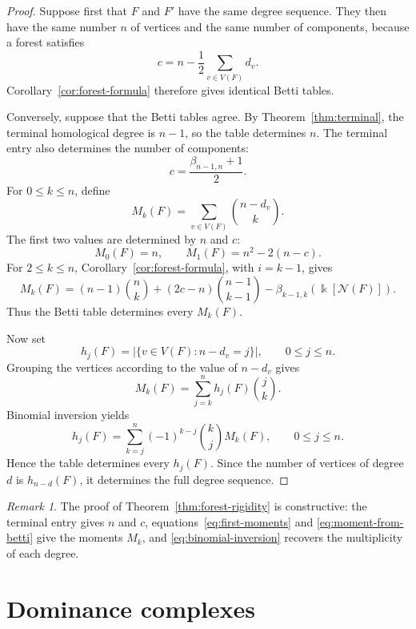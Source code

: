 \documentclass[11pt]{amsart}
\theoremstyle{definition}
\theoremstyle{remark}
\newtheorem{remark}[theorem]{Remark}
\numberwithin{equation}{section}
\newcommand{\NN}{\mathcal N}
\begin{document}
	\begin{proof}
		Suppose first that \(F\) and \(F'\) have the same degree sequence. They then
		have the same number \(n\) of vertices and the same number of components,
		because a forest satisfies
		\[
		c=n-\frac12\sum_{v\in V(F)}d_v.
		\]
		Corollary~\ref{cor:forest-formula} therefore gives identical Betti tables.

		Conversely, suppose that the Betti tables agree. By
		Theorem~\ref{thm:terminal}, the terminal homological degree is \(n-1\), so the
		table determines \(n\). The terminal entry also determines the number of
		components:
		\[
		c=\frac{\beta_{n-1,n}+1}{2}.
		\]
		For \(0\le k\le n\), define
		\[
		M_k(F)=\sum_{v\in V(F)}\binom{n-d_v}{k}.
		\]
		The first two values are determined by \(n\) and \(c\):
		\begin{equation}\label{eq:first-moments}
			M_0(F)=n,
			\qquad
			M_1(F)=n^2-2(n-c).
		\end{equation}
		For \(2\le k\le n\), Corollary~\ref{cor:forest-formula}, with \(i=k-1\),
		gives
		\begin{equation}\label{eq:moment-from-betti}
			M_k(F)
			=
			(n-1)\binom nk
			+(2c-n)\binom{n-1}{k-1}
			-\beta_{k-1,k}(\Bbbk[\NN(F)]).
		\end{equation}
		Thus the Betti table determines every \(M_k(F)\).

		Now set
		\[
		h_j(F)=\bigl|\{v\in V(F):n-d_v=j\}\bigr|,
		\qquad 0\le j\le n.
		\]
		Grouping the vertices according to the value of \(n-d_v\) gives
		\[
		M_k(F)=\sum_{j=k}^{n}h_j(F)\binom jk.
		\]
		Binomial inversion yields
		\begin{equation}\label{eq:binomial-inversion}
			h_j(F)=
			\sum_{k=j}^{n}
			(-1)^{k-j}\binom kj M_k(F),
			\qquad 0\le j\le n.
		\end{equation}
		Hence the table determines every \(h_j(F)\). Since the number of vertices of
		degree \(d\) is \(h_{n-d}(F)\), it determines the full degree sequence.
	\end{proof}

	\begin{remark}
		The proof of Theorem~\ref{thm:forest-rigidity} is constructive: the terminal
		entry gives \(n\) and \(c\), equations~\eqref{eq:first-moments} and
		\eqref{eq:moment-from-betti} give the moments \(M_k\), and
		\eqref{eq:binomial-inversion} recovers the multiplicity of each degree.
	\end{remark}

	\section{Dominance complexes}\label{sec:dominance}
	
\end{document}
